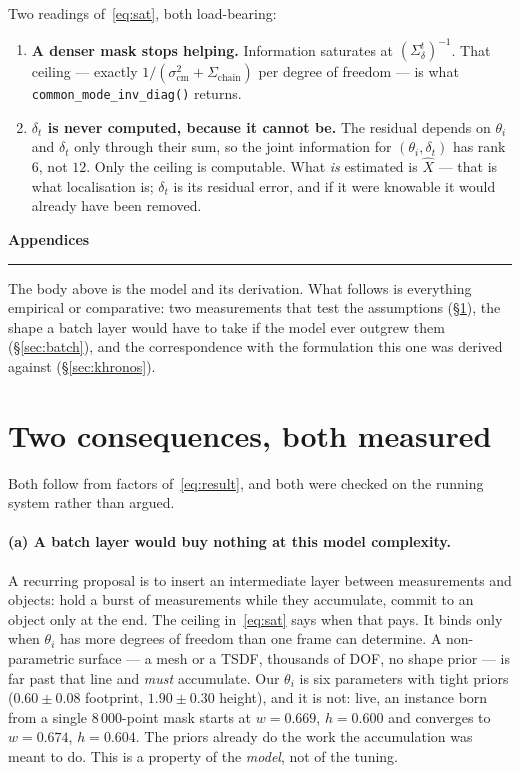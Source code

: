\documentclass[11pt,a4paper]{report}
\theoremstyle{definition}   %
\begin{document}
Two readings of~\eqref{eq:sat}, both load-bearing:
\begin{enumerate}[leftmargin=1.6em]
\item \textbf{A denser mask stops helping.} Information saturates at $(\Sigma_\delta^t)^{-1}$.
      That ceiling --- exactly $1/(\sigma^2_{\mathrm{cm}}+\Sigma_{\text{chain}})$ per degree of
      freedom --- is what \texttt{common\_\allowbreak mode\_\allowbreak inv\_\allowbreak diag()}
      returns.
\item \textbf{$\delta_t$ is never computed, because it cannot be.} The residual depends on
      $\theta_i$ and $\delta_t$ only through their sum, so the joint information for
      $(\theta_i,\delta_t)$ has rank $6$, not $12$. Only the ceiling is computable. What
      \emph{is} estimated is $\hat X$ — that is what localisation is; $\delta_t$ is its residual
      error, and if it were knowable it would already have been removed.
\end{enumerate}

\clearpage
\appendix
\renewcommand{\thesection}{\Alph{section}}
\setcounter{section}{0}

\begin{center}
{\Large\bfseries Appendices}\\[4pt]
\rule{0.32\textwidth}{0.4pt}
\end{center}

\medskip\noindent
The body above is the model and its derivation. What follows is everything empirical or
comparative: two measurements that test the assumptions (\S\ref{sec:consequences}), the shape a
batch layer would have to take if the model ever outgrew them (\S\ref{sec:batch}), and the
correspondence with the formulation this one was derived against (\S\ref{sec:khronos}).

\section{Two consequences, both measured}
\label{sec:consequences}

Both follow from factors of~\eqref{eq:result}, and both were checked on the running system rather
than argued.

\paragraph{(a) A batch layer would buy nothing at this model complexity.}
A recurring proposal is to insert an intermediate layer between measurements and objects: hold a
burst of measurements while they accumulate, commit to an object only at the end. The ceiling
in~\eqref{eq:sat} says when that pays. It binds only when $\theta_i$ has more degrees of freedom
than one frame can determine. A non-parametric surface --- a mesh or a TSDF, thousands of DOF, no
shape prior --- is far past that line and \emph{must} accumulate. Our $\theta_i$ is six
parameters with tight priors ($0.60\pm0.08$ footprint, $1.90\pm0.30$ height), and it is not:
live, an instance born from a single $8\,000$-point mask starts at $w=0.669$, $h=0.600$ and
converges to $w=0.674$, $h=0.604$. The priors already do the work the accumulation was meant to
do. This is a property of the \emph{model}, not of the tuning.
\end{document}
